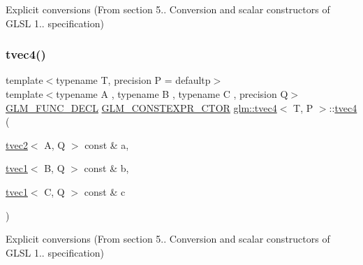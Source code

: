Explicit conversions (From section 5.. Conversion and scalar constructors of G\+L\+SL 1.. specification) 

\mbox{\label{structglm_1_1tvec4_a51f1f037c1b0ddc5cf7b610c6efda7f7}} 
\subsubsection{\texorpdfstring{tvec4()}{tvec4()}\hspace{0.1cm}{\footnotesize\ttfamily [10/35]}}
{\footnotesize\ttfamily template$<$typename T, precision P = defaultp$>$ \\
template$<$typename A , typename B , typename C , precision Q$>$ \\
\mbox{\hyperlink{setup_8hpp_ab2d052de21a70539923e9bcbf6e83a51}{G\+L\+M\+\_\+\+F\+U\+N\+C\+\_\+\+D\+E\+CL}} \mbox{\hyperlink{setup_8hpp_ad34178a09666081abdb573c14d1f4a5a}{G\+L\+M\+\_\+\+C\+O\+N\+S\+T\+E\+X\+P\+R\+\_\+\+C\+T\+OR}} \mbox{\hyperlink{structglm_1_1tvec4}{glm\+::tvec4}}$<$ T, P $>$\+::\mbox{\hyperlink{structglm_1_1tvec4}{tvec4}} (\begin{DoxyParamCaption}\item[{\mbox{\hyperlink{structglm_1_1tvec2}{tvec2}}$<$ A, Q $>$ const \&}]{a,  }\item[{\mbox{\hyperlink{structglm_1_1tvec1}{tvec1}}$<$ B, Q $>$ const \&}]{b,  }\item[{\mbox{\hyperlink{structglm_1_1tvec1}{tvec1}}$<$ C, Q $>$ const \&}]{c }\end{DoxyParamCaption})}



Explicit conversions (From section 5.. Conversion and scalar constructors of G\+L\+SL 1.. specification) 

\mbox{\label{structglm_1_1tvec4_a9a93a56b36b84497626d62d7095e8180}} 
